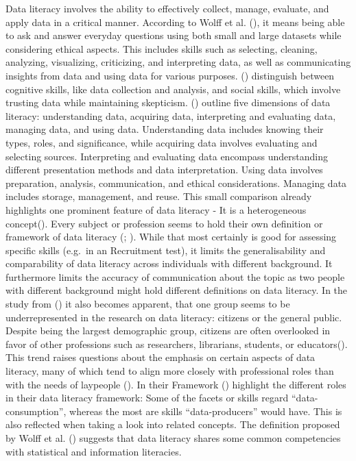 \documentclass[
  12pt,
  a4paper,
  twoside]{article}
\begin{document}
Data literacy involves the ability to effectively collect, manage,
evaluate, and apply data in a critical manner. According to Wolff et al.
(), it means being able to ask and answer
everyday questions using both small and large datasets while considering
ethical aspects. This includes skills such as selecting, cleaning,
analyzing, visualizing, criticizing, and interpreting data, as well as
communicating insights from data and using data for various purposes.
() distinguish between cognitive
skills, like data collection and analysis, and social skills, which
involve trusting data while maintaining skepticism.
() outline five
dimensions of data literacy: understanding data, acquiring data,
interpreting and evaluating data, managing data, and using data.
Understanding data includes knowing their types, roles, and
significance, while acquiring data involves evaluating and selecting
sources. Interpreting and evaluating data encompass understanding
different presentation methods and data interpretation. Using data
involves preparation, analysis, communication, and ethical
considerations. Managing data includes storage, management, and reuse.
This small comparison already highlights one prominent feature of data
literacy - It is a heterogeneous concept(). Every subject or profession seems to hold their own
definition or framework of data literacy (; ). While that
most certainly is good for assessing specific skills (e.g.~in an
Recruitment test), it limits the generalisability and comparability of
data literacy across individuals with different background. It
furthermore limits the accuracy of communication about the topic as two
people with different background might hold different definitions on
data literacy. In the study from () it also becomes apparent, that one group seems to be
underrepresented in the research on data literacy: citizens or the
general public. Despite being the largest demographic group, citizens
are often overlooked in favor of other professions such as researchers,
librarians, students, or educators(). This trend raises questions about the emphasis on certain
aspects of data literacy, many of which tend to align more closely with
professional roles than with the needs of laypeople
(). In their Framework
() highlight the different
roles in their data literacy framework: Some of the facets or skills
regard ``data-consumption'', whereas the most are skills
``data-producers'' would have. This is also reflected when taking a look
into related concepts. The definition proposed by Wolff et al.
() suggests that data literacy shares some
common competencies with statistical and information literacies.
\end{document}
